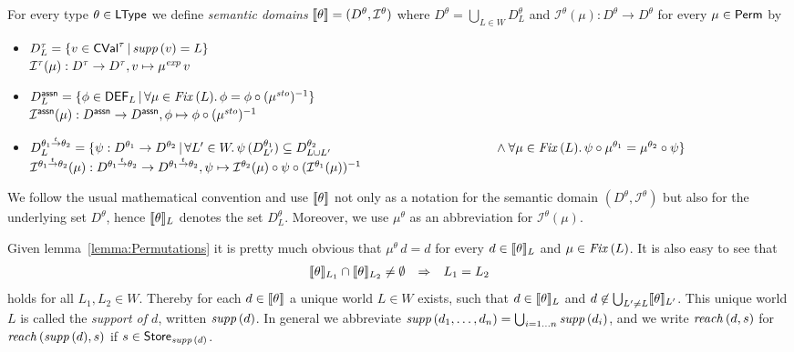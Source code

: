 \documentclass[12pt,a4paper]{report}
\newcommand{\CVal}{\sstyle{CVal}}
\newcommand{\sexp}{\nstyle{exp}}
\newcommand{\ssto}{\nstyle{sto}}
\newcommand{\DEF}{\sstyle{DEF}}
\newcommand{\I}{\mathcal{I}}
\newcommand{\Fix}[1]{\nstyle{Fix}\,(#1)}
\begin{document}
\begin{definition}
  For every type $\theta\in\mathsf{LType}$ we define {\em semantic domains} $\semantic{\theta} = (D^\theta,\I^\theta)$ where
  $D^\theta = \bigcup_{L \in W} D^\theta_L$ and $\I^\theta(\mu) : D^\theta \to D^\theta$ for every $\mu \in \mathsf{Perm}$ by
  \begin{itemize}
    \item $D^\tau_L = \{v\in\CVal^\tau\,|\,\supp{v} = L\}$ \\
          $\I^\tau(\mu): D^\tau \to D^\tau, v \mapsto \mu^\sexp\,v$

    \item $D^\tassn_L = \{ \phi\in\DEF_L\,|\,\forall \mu\in\Fix{L}.\,\phi = \phi \circ (\mu^\ssto)^{-1}\}$ \\
          $\I^\tassn(\mu): D^\tassn \to D^\tassn, \phi \mapsto \phi \circ (\mu^\ssto)^{-1}$

    \item $D^{\ttarrow{\theta_1}{\theta_2}}_L = \{ \psi: D^{\theta_1} \to D^{\theta_2}\,|\,
              \forall L'\in W.\,\psi\,(D^{\theta_1}_{L'}) \subseteq D^{\theta_2}_{L \cup L'} \\
              \hspace*{4.5cm} \wedge \forall \mu\in\Fix{L}.\,\psi\circ\mu^{\theta_1}=\mu^{\theta_2}\circ\psi\}$\\
          $\I^{\ttarrow{\theta_1}{\theta_2}}(\mu):D^{\ttarrow{\theta_1}{\theta_2}}\to D^{\ttarrow{\theta_1}{\theta_2}},
                              \psi \mapsto \I^{\theta_2}(\mu) \circ \psi \circ (\I^{\theta_1}(\mu))^{-1}$
  \end{itemize}
\end{definition}

We follow the usual mathematical convention and use $\llbracket\theta\rrbracket$ not only as a notation
for the semantic domain $(D^\theta,\I^\theta)$ but also for the underlying set $D^\theta$,
hence $\llbracket\theta\rrbracket_L$ denotes the set $D^\theta_L$. Moreover, we use $\mu^\theta$ as an abbreviation
for $\I^\theta(\mu)$.

Given lemma~\ref{lemma:Permutations}
it is pretty much obvious that $\mu^\theta\,d = d$ for every $d \in \llbracket\theta\rrbracket_L$ and
$\mu\in\Fix{L}$.
It is also easy to see that
\[\begin{array}{rcl}
  \llbracket\theta\rrbracket_{L_1} \cap \llbracket\theta\rrbracket_{L_2} \ne \emptyset &\Rightarrow& L_1=L_2
\end{array}\]
holds for all $L_1,L_2\in W$. Thereby for each $d \in \llbracket\theta\rrbracket$ a
unique world $L \in W$ exists, such that $d \in \llbracket\theta\rrbracket_L$ and $d \not\in \bigcup_{L'\ne L} \llbracket\theta\rrbracket_{L'}$.
This unique world $L$ is called the {\em support of $d$}, written $\mathit{supp}\,(d)$. In general we abbreviate
$\mathit{supp}\,(d_1,\ldots,d_n) = \bigcup_{i=1\ldots n}\mathit{supp}\,(d_i)$, and we write
$\mathit{reach}\,(d,s)$ for $\mathit{reach}\,(\mathit{supp}\,(d),s)$ if $s \in \mathsf{Store}_{\mathit{supp}\,(d)}$.
\end{document}
